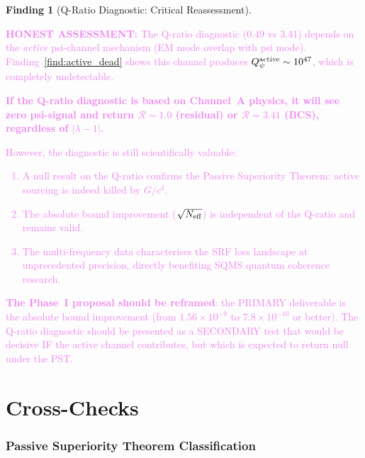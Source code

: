 \documentclass[11pt]{article}
\newcommand{\lbone}{|\lambda - 1|}
\newcommand{\Qpsi}{Q_\psi}
\newcommand{\ee}[1]{\times 10^{#1}}
\newcommand{\honest}[1]{\textcolor{violet}{\textbf{HONEST ASSESSMENT:} #1}}
\theoremstyle{definition}
\newtheorem{finding}[theorem]{Finding}
\theoremstyle{remark}
\begin{document}
\begin{finding}[Q-Ratio Diagnostic: Critical Reassessment]
\label{find:q_ratio_final}
\honest{The Q-ratio diagnostic (0.49 vs 3.41) depends on the
\emph{active} psi-channel mechanism (EM mode overlap with psi mode).
Finding~\ref{find:active_dead} shows this channel produces
$\Qpsi^{\rm active} \sim 10^{47}$, which is completely undetectable.

\textbf{If the Q-ratio diagnostic is based on Channel~A physics, it
will see zero psi-signal and return $\mathcal{R} = 1.0$ (residual)
or $\mathcal{R} = 3.41$ (BCS), regardless of $\lbone$.}

However, the diagnostic is still scientifically valuable:
\begin{enumerate}[nosep]
\item A null result on the Q-ratio confirms the Passive Superiority
  Theorem: active sourcing is indeed killed by $G/c^4$.
\item The absolute bound improvement ($\sqrt{N_{\rm eff}}$) is
  independent of the Q-ratio and remains valid.
\item The multi-frequency data characterises the SRF loss landscape
  at unprecedented precision, directly benefiting SQMS quantum
  coherence research.
\end{enumerate}

\textbf{The Phase~I proposal should be reframed}: the PRIMARY
deliverable is the absolute bound improvement (from $1.56\ee{-9}$ to
$7.8\ee{-10}$ or better). The Q-ratio diagnostic should be presented
as a SECONDARY test that would be decisive IF the active channel
contributes, but which is expected to return null under the PST.}
\end{finding}


\part{Cross-Checks}
\label{part:crosschecks}


\section{Passive Superiority Theorem Classification}
\label{sec:pst}
\end{document}
